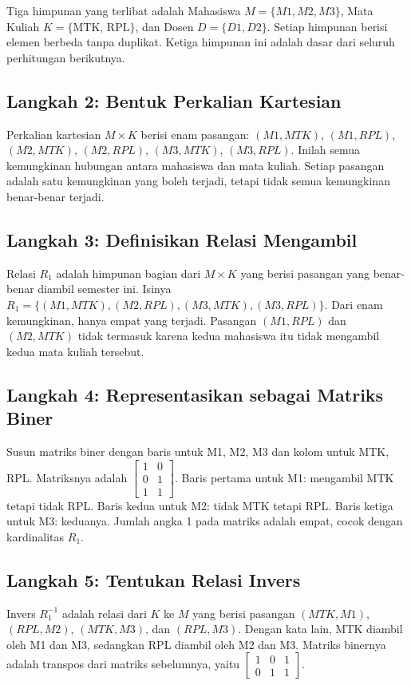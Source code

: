 \documentclass[11pt,a4paper]{article}
\begin{document}
Tiga himpunan yang terlibat adalah Mahasiswa $M=\{M1,M2,M3\}$, Mata Kuliah $K=\{\text{MTK, RPL}\}$, dan Dosen $D=\{D1,D2\}$. Setiap himpunan berisi elemen berbeda tanpa duplikat. Ketiga himpunan ini adalah dasar dari seluruh perhitungan berikutnya.

\subsection{Langkah 2: Bentuk Perkalian Kartesian}

Perkalian kartesian $M \times K$ berisi enam pasangan: $(M1,MTK)$, $(M1,RPL)$, $(M2,MTK)$, $(M2,RPL)$, $(M3,MTK)$, $(M3,RPL)$. Inilah semua kemungkinan hubungan antara mahasiswa dan mata kuliah. Setiap pasangan adalah satu kemungkinan yang boleh terjadi, tetapi tidak semua kemungkinan benar-benar terjadi.

\subsection{Langkah 3: Definisikan Relasi Mengambil}

Relasi $R_1$ adalah himpunan bagian dari $M \times K$ yang berisi pasangan yang benar-benar diambil semester ini. Isinya $R_1=\{(M1,MTK),(M2,RPL),(M3,MTK),(M3,RPL)\}$. Dari enam kemungkinan, hanya empat yang terjadi. Pasangan $(M1,RPL)$ dan $(M2,MTK)$ tidak termasuk karena kedua mahasiswa itu tidak mengambil kedua mata kuliah tersebut.

\subsection{Langkah 4: Representasikan sebagai Matriks Biner}

Susun matriks biner dengan baris untuk M1, M2, M3 dan kolom untuk MTK, RPL. Matriksnya adalah $\begin{bmatrix}1&0\\0&1\\1&1\end{bmatrix}$. Baris pertama untuk M1: mengambil MTK tetapi tidak RPL. Baris kedua untuk M2: tidak MTK tetapi RPL. Baris ketiga untuk M3: keduanya. Jumlah angka 1 pada matriks adalah empat, cocok dengan kardinalitas $R_1$.

\subsection{Langkah 5: Tentukan Relasi Invers}

Invers $R_1^{-1}$ adalah relasi dari $K$ ke $M$ yang berisi pasangan $(MTK,M1)$, $(RPL,M2)$, $(MTK,M3)$, dan $(RPL,M3)$. Dengan kata lain, MTK diambil oleh M1 dan M3, sedangkan RPL diambil oleh M2 dan M3. Matriks binernya adalah transpos dari matriks sebelumnya, yaitu $\begin{bmatrix}1&0&1\\0&1&1\end{bmatrix}$.
\end{document}
